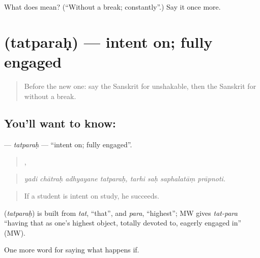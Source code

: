 \begin{tcolorbox}[breakable,colback=teal!4,colframe=teal!35!black,title={Before you move on}]
What does  mean? (\textquotedblleft{}Without a break; constantly\textquotedblright{}.) Say it once more.
\end{tcolorbox}
\section[\texorpdfstring{\sk{तत्परः} (tatparaḥ)}{तत्परः (tatparaḥ)}]{ (tatparaḥ) — intent on; fully engaged}

\label{lesson:SA-C393-tatparah}



\begin{quote}
Before the new one: say the Sanskrit for unshakable, then the Sanskrit for without a break.
\end{quote}

\subsection*{You'll want to know: }
\textbf{} — \emph{tatparaḥ} — \textquotedblleft{}intent on; fully engaged\textquotedblright{}.

\begin{quote}
   ,    
\end{quote}

\begin{quote}
\emph{yadi chātraḥ adhyayane tatparaḥ, tarhi saḥ saphalatāṃ prāpnoti.}
\end{quote}

\begin{quote}
If a student is intent on study, he succeeds.
\end{quote}

\begin{cousinweb}
\textbf{} (\emph{tatparaḥ}) is built from \emph{tat}, \textquotedblleft{}that\textquotedblright{}, and \emph{para}, \textquotedblleft{}highest\textquotedblright{}; MW gives \emph{tat-para} \textquotedblleft{}having that as one's highest object, totally devoted to, eagerly engaged in\textquotedblright{} (MW).
\end{cousinweb}

\begin{grammarlens}[title={What you've built}]
One more word for saying what happens if.
\end{grammarlens}

